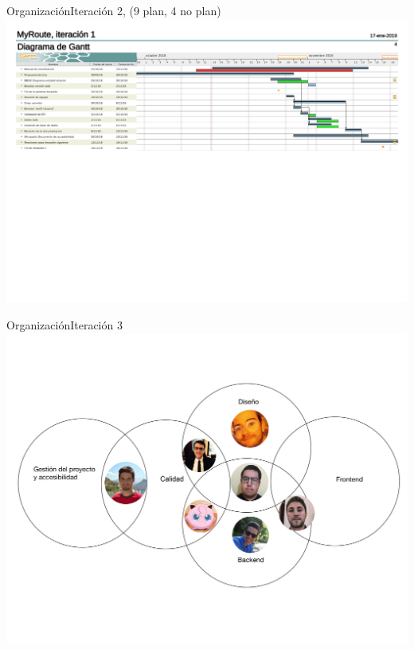 \documentclass{beamer}
\begin{document}
\begin{frame}{Organizaci\'on}{Iteraci\'on 2, (9 plan, 4 no plan)}
\centering
\hspace{1cm}
\break
\newline
\break
\includegraphics[width=0.8\paperwidth]{images_latex/gantt_itr2}
\end{frame}



\begin{frame}{Organizaci\'on}{Iteraci\'on 3}
\includegraphics[scale=0.1]{images_latex/org_itr3}
\end{frame}
\end{document}
